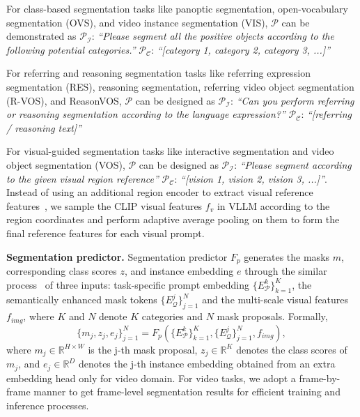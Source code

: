 For class-based segmentation tasks like panoptic segmentation, open-vocabulary segmentation (OVS), and video instance segmentation (VIS),  $\mathcal{P}$ can be demonstrated as $\mathcal{P_I}$: \emph{``Please segment all the positive objects according to the following potential categories.''} $\mathcal{P_C}$: \emph{``[category 1, category 2, category 3, ...]''}
\vspace{-0.5mm}

For referring and reasoning segmentation tasks like referring expression segmentation (RES), reasoning segmentation, referring video object segmentation (R-VOS), and ReasonVOS, $\mathcal{P}$ can be designed as
 $\mathcal{P_I}$: \emph{``Can you perform referring or reasoning segmentation according to the language expression?''}
 $\mathcal{P_C}$: \emph{``[referring / reasoning text]''}

For visual-guided segmentation tasks like interactive segmentation and video object segmentation (VOS), $\mathcal{P}$ can be designed as
 $\mathcal{P_I}$: \emph{``Please segment according to the given visual region reference''}
 $\mathcal{P_C}$: \emph{``[vision 1, vision 2, vision 3, ...]''}. 
Instead of using an additional region encoder to extract visual reference features~\cite{lin2023uninext}, we sample the CLIP visual features $f_{v}$ in VLLM according to the region coordinates and perform adaptive average pooling on them to form the final reference features for each visual prompt.

\noindent \textbf{Segmentation predictor.} Segmentation predictor $F_{p}$ generates the masks $m$, corresponding class scores $z$, and instance embedding $e$ through the similar process~\cite{cheng2022masked, gu2024dataseg} of three inputs: task-specific prompt embedding $\{E_{\mathcal{P}}^{k}\}_{k=1}^{K}$, the semantically enhanced mask tokens $\{E_{\mathcal{Q}}^{j}\}_{j=1}^{N}$ and the multi-scale visual features $f_{img}$, where $K$ and $N$ denote $K$ categories and $N$ mask proposals. Formally,
\begin{equation}
    \{m_{j}, z_{j}, e_{j}\}_{j=1}^{N} = F_{p}(\{E_{\mathcal{P}}^{k}\}_{k=1}^{K}, \{E_{\mathcal{Q}}^{j}\}_{j=1}^{N}, f_{img}),
\end{equation}
where $m_{j}\in \mathbb{R}^{H\times W}$ is the j-th mask proposal, $z_{j}\in \mathbb{R}^{K}$ denotes the class scores of $m_{j}$, and $e_{j}\in \mathbb{R}^{D}$ denotes the j-th instance embedding obtained from an extra embedding head only for video domain.
For video tasks, we adopt a frame-by-frame manner to get frame-level segmentation results for efficient training and inference processes.

